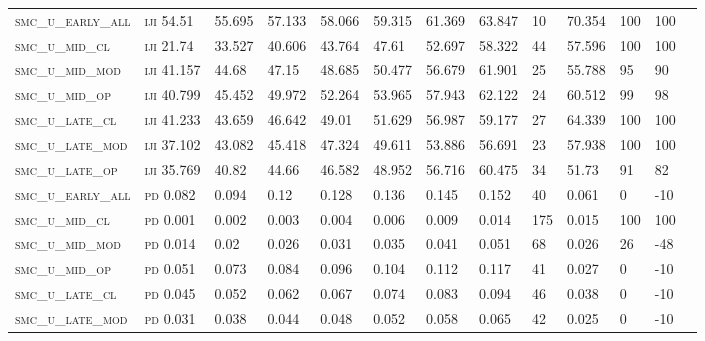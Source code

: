 \begin{landscape}
\begin{center}
\begin{footnotesize}
\begin{longtable}{lllllllllllll}
\textsc{smc\_u\_early\_all} & \textsc{iji       }   54.51    & 55.695   & 57.133   & 58.066   & 59.315   & 61.369   & 63.847   & 10   & 70.354   & 100 & 100  \\
\textsc{smc\_u\_mid\_cl   } & \textsc{iji       }   21.74    & 33.527   & 40.606   & 43.764   & 47.61    & 52.697   & 58.322   & 44   & 57.596   & 100 & 100  \\
\textsc{smc\_u\_mid\_mod  } & \textsc{iji       }   41.157   & 44.68    & 47.15    & 48.685   & 50.477   & 56.679   & 61.901   & 25   & 55.788   & 95  & 90   \\
\textsc{smc\_u\_mid\_op   } & \textsc{iji       }   40.799   & 45.452   & 49.972   & 52.264   & 53.965   & 57.943   & 62.122   & 24   & 60.512   & 99  & 98   \\
\textsc{smc\_u\_late\_cl  } & \textsc{iji       }   41.233   & 43.659   & 46.642   & 49.01    & 51.629   & 56.987   & 59.177   & 27   & 64.339   & 100 & 100  \\
\textsc{smc\_u\_late\_mod } & \textsc{iji       }   37.102   & 43.082   & 45.418   & 47.324   & 49.611   & 53.886   & 56.691   & 23   & 57.938   & 100 & 100  \\
\textsc{smc\_u\_late\_op  } & \textsc{iji       }   35.769   & 40.82    & 44.66    & 46.582   & 48.952   & 56.716   & 60.475   & 34   & 51.73    & 91  & 82   \\
\textsc{smc\_u\_early\_all} & \textsc{pd        }   0.082    & 0.094    & 0.12     & 0.128    & 0.136    & 0.145    & 0.152    & 40   & 0.061    & 0   & -10  \\
\textsc{smc\_u\_mid\_cl   } & \textsc{pd        }   0.001    & 0.002    & 0.003    & 0.004    & 0.006    & 0.009    & 0.014    & 175  & 0.015    & 100 & 100  \\
\textsc{smc\_u\_mid\_mod  } & \textsc{pd        }   0.014    & 0.02     & 0.026    & 0.031    & 0.035    & 0.041    & 0.051    & 68   & 0.026    & 26  & -48  \\
\textsc{smc\_u\_mid\_op   } & \textsc{pd        }   0.051    & 0.073    & 0.084    & 0.096    & 0.104    & 0.112    & 0.117    & 41   & 0.027    & 0   & -10  \\
\textsc{smc\_u\_late\_cl  } & \textsc{pd        }   0.045    & 0.052    & 0.062    & 0.067    & 0.074    & 0.083    & 0.094    & 46   & 0.038    & 0   & -10  \\
\textsc{smc\_u\_late\_mod } & \textsc{pd        }   0.031    & 0.038    & 0.044    & 0.048    & 0.052    & 0.058    & 0.065    & 42   & 0.025    & 0   & -10  \\

\end{longtable}
\end{footnotesize}
\end{center}
\end{landscape}
